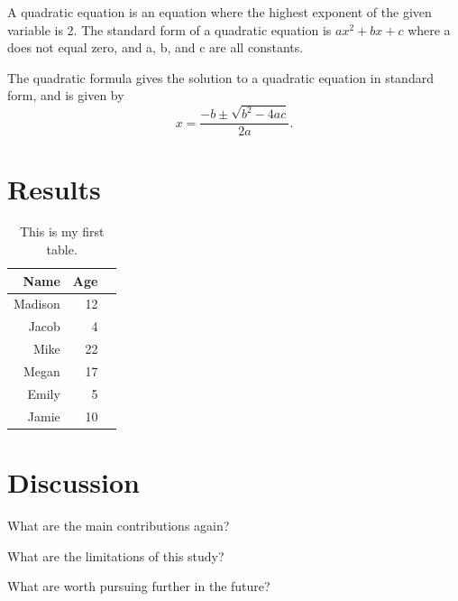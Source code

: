 \documentclass[12pt]{article}
\begin{document}
 A quadratic equation is an equation where the highest exponent of the given variable is 2. The standard form of a quadratic equation is $ax^2 + bx +c$ where a does not equal zero, and a, b, and c are all constants.

 The quadratic formula gives the solution to a quadratic equation in standard form, and is given by $$x=\frac{-b\pm\sqrt{b^2-4ac}}{2a}.$$

 \section{Results}
 \label{sec:results}

 \begin{table}[ht]
    \caption{This is my first table.}
    \label{tab:rv}
  \centering
  \begin{tabular}{rrr}
    \hline
  Name & Age \\ 
    \hline
    Madison & 12 \\ 
    Jacob & 4 \\ 
    Mike & 22 \\ 
    Megan & 17 \\ 
    Emily & 5 \\ 
    Jamie & 10 \\ 
     \hline
  \end{tabular}
  \end{table}

 \section{Discussion}
 \label{sec:disc}

 What are the main contributions again?

 What are the limitations of this study?

 What are worth pursuing further in the future?




 
\end{document}
